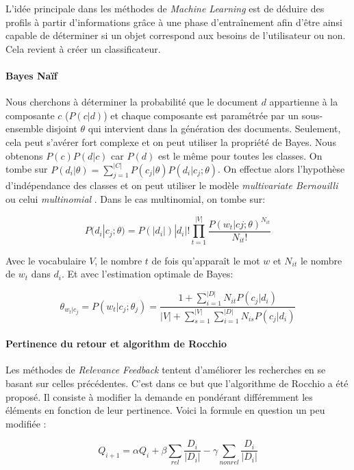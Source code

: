 L'idée principale dans les méthodes de \textit{Machine Learning} est de déduire des profils à partir d'informations grâce à une phase d'entraînement afin d'être ainsi capable de déterminer si un objet correspond aux besoins de l'utilisateur ou non. Cela revient à créer un classificateur.

\paragraph{Bayes Naïf}

Nous cherchons à déterminer la probabilité que le document $d$ appartienne à la composante $c$ ($P(c|d)$) et chaque composante est paramétrée par un sous-ensemble disjoint $\theta$ qui intervient dans la génération des documents. Seulement, cela peut s'avérer fort complexe et on peut utiliser la propriété de Bayes. Nous obtenons $P(c)P(d|c)$ car $P(d)$ est le même pour toutes les classes. On tombe sur $P(d_{i}|\theta) = \sum\nolimits_{j=1}^{|C|}P(c_{j}|\theta)P(d_{i}|c_{j};\theta)$. On effectue alors l'hypothèse d'indépendance des classes et on peut utiliser le modèle \textit{multivariate Bernouilli} ou celui \textit{multinomial} \cite{mccallum1998comparison}. Dans le cas multinomial, on tombe sur:

$$ P(d_{i}|c_{j}; \theta) = P(|d_{i}|)|d_{i}|!\prod\limits_{t=1}^{|V|}\frac{P(w_{t}|c{j}; \theta)^{N_{it}}}{N_{it}!} $$

Avec le vocabulaire $V$, le nombre $t$ de fois qu'apparaît le mot $w$ et $N_{it}$ le nombre de $w_{t}$ dans $d_{i}$. Et avec l'estimation optimale de Bayes:

$$ \theta_{w_{t}|c_{j}} = P(w_{t}|c_{j}; \theta_{j} ) = \frac{1 + \sum\nolimits_{i=1}^{|D|}N_{it}P(c_{j}|d_{i})}{|V| + \sum\nolimits_{s=1}^{|V|}\sum\nolimits_{i=1}^{|D|}N_{is}P(c_{j}|d_{i})} $$

\paragraph{Pertinence du retour et algorithm de Rocchio}

Les méthodes de \textit{Relevance Feedback} tentent d'améliorer les recherches en se basant sur celles précédentes. C'est dans ce but que l'algorithme de Rocchio a été proposé. Il consiste à modifier la demande en pondérant différemment les éléments en fonction de leur pertinence. Voici la formule en question un peu modifiée \cite{rocchio1971relevance}:

$$ Q_{i+1} = \alpha Q_{i} + \beta \sum\limits_{rel}\frac{D_{i}}{|D_{i}|} - \gamma \sum\limits_{nonrel}\frac{D_{i}}{|D_{i}|} $$

